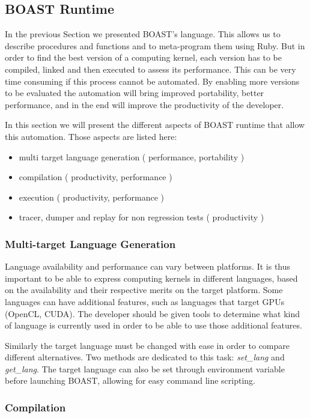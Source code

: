 \documentclass[11pt, a4paper, twoside]{montblanc}
\begin{document}
\subsection{BOAST Runtime}

In the previous Section we presented BOAST's language. This allows us to
describe procedures and functions and to meta-program them using Ruby. But in
order to find the best version of a computing kernel, each version has to be
compiled, linked and then executed to assess its performance. This can be very
time consuming if this process cannot be automated. By enabling more versions to
be evaluated the automation will bring improved portability, better performance,
and in the end will improve the productivity of the developer.

In this section we will present the different aspects of BOAST runtime that
allow this automation. Those aspects are listed here:
  \begin{itemize}
  \item multi target language generation ( performance, portability )
  \item compilation ( productivity, performance )
  \item execution ( productivity, performance )
  \item tracer, dumper and replay for non regression tests ( productivity )
  \end{itemize}

  \subsubsection{Multi-target Language Generation}
\label{sec:multitarget}
Language availability and performance can vary between platforms. It is thus
important to be able to express computing kernels in different languages, based
on the availability and their respective merits on the target platform. Some
languages can have additional features, such as languages that target GPUs
(OpenCL, CUDA). The developer should be given tools to determine what kind of
language is currently used in order to be able to use those additional features.

Similarly the target language must be changed with ease in order to compare
different alternatives. Two methods are dedicated to this task: \emph{set\_lang}
and \emph{get\_lang}. The target language can also be set through environment
variable before launching BOAST, allowing for easy command line scripting.

  \subsubsection{Compilation}
\end{document}

